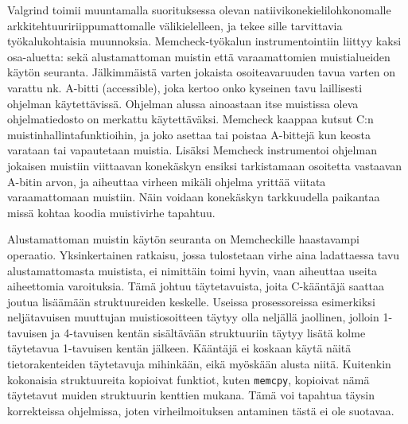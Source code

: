 Valgrind toimii muuntamalla suorituksessa olevan natiivikonekielilohkon\fixme omalle
arkkitehtuuririippumattomalle välikielelleen,
ja tekee sille tarvittavia työkalukohtaisia muunnoksia.
Memcheck-työkalun instrumentointiin liittyy kaksi osa-aluetta:
sekä alustamattoman muistin että varaamattomien muistialueiden käytön seuranta.
Jälkimmäistä varten jokaista osoiteavaruuden tavua varten on varattu nk. A-bitti (accessible),
joka kertoo onko kyseinen tavu laillisesti ohjelman käytettävissä.
Ohjelman alussa ainoastaan itse muistissa oleva ohjelmatiedosto on merkattu käytettäväksi.
Memcheck kaappaa kutsut C:n muistinhallintafunktioihin,
ja joko asettaa tai poistaa A-bittejä kun keosta varataan tai vapautetaan muistia.
Lisäksi Memcheck instrumentoi ohjelman jokaisen muistiin viittaavan konekäskyn
ensiksi tarkistamaan osoitetta vastaavan A-bitin arvon,
ja aiheuttaa virheen mikäli ohjelma yrittää viitata varaamattomaan muistiin.
Näin voidaan konekäskyn tarkkuudella paikantaa missä kohtaa koodia
muistivirhe tapahtuu.

Alustamattoman muistin käytön seuranta on Memcheckille haastavampi operaatio.
Yksinkertainen ratkaisu, jossa tulostetaan virhe aina ladattaessa
tavu alustamattomasta muistista, ei nimittäin toimi hyvin, vaan aiheuttaa
useita aiheettomia varoituksia.
Tämä johtuu täytetavuista, joita C-kääntäjä saattaa joutua lisäämään struktuureiden keskelle.
Useissa prosessoreissa esimerkiksi neljätavuisen muuttujan muistiosoitteen täytyy olla neljällä jaollinen,
jolloin 1-tavuisen ja 4-tavuisen kentän sisältävään struktuuriin täytyy lisätä kolme täytetavua
1-tavuisen kentän jälkeen.
Kääntäjä ei koskaan käytä näitä tietorakenteiden täytetavuja mihinkään, eikä myöskään alusta niitä.
Kuitenkin kokonaisia struktuureita kopioivat funktiot, kuten \texttt{memcpy},
kopioivat nämä täytetavut muiden struktuurin kenttien mukana.
Tämä voi tapahtua täysin korrekteissa ohjelmissa,
joten virheilmoituksen antaminen tästä ei ole suotavaa.

